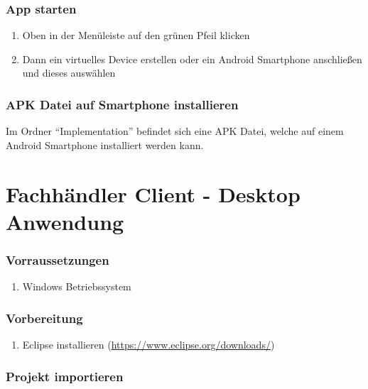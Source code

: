 \subsubsection{App starten}

\begin{enumerate}
\item Oben in der Menüleiste auf den grünen Pfeil klicken
\item Dann ein virtuelles Device erstellen oder ein Android Smartphone anschließen und dieses auswählen
\end{enumerate}

\subsubsection{APK Datei auf Smartphone installieren}

Im Ordner ``Implementation'' befindet sich eine APK Datei, welche auf einem Android Smartphone installiert werden kann.

\section{Fachhändler Client - Desktop Anwendung}

\subsubsection{Vorraussetzungen}

\begin{enumerate}
\item Windows Betriebssystem
\end{enumerate}

\subsubsection{Vorbereitung}

\begin{enumerate}
\item Eclipse installieren (\url{https://www.eclipse.org/downloads/})
\end{enumerate}

\subsubsection{Projekt importieren}

